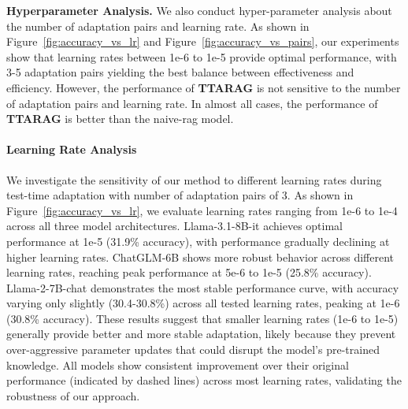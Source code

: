 \documentclass{article}
\newcommand{\ourmethod}{{\fontfamily{lmtt}\selectfont \textbf{TTARAG}}\xspace}
\begin{document}
\fi

\noindent\textbf{Hyperparameter Analysis.}
We also conduct hyper-parameter analysis about the number of adaptation pairs and learning rate. 
As shown in Figure~\ref{fig:accuracy_vs_lr} and Figure~\ref{fig:accuracy_vs_pairs}, our experiments show that learning rates between 1e-6 to 1e-5 provide optimal performance, with 3-5 adaptation pairs yielding the best balance between effectiveness and efficiency. However, the performance of \ourmethod is not sensitive to the number of adaptation pairs and learning rate. In almost all cases, the performance of \ourmethod is better than the naive-rag model.

\iffalse
\paragraph{Learning Rate Analysis} We investigate the sensitivity of our method to different learning rates during test-time adaptation with number of adaptation pairs of 3. As shown in Figure~\ref{fig:accuracy_vs_lr}, we evaluate learning rates ranging from 1e-6 to 1e-4 across all three model architectures. Llama-3.1-8B-it achieves optimal performance at 1e-5 (31.9\% accuracy), with performance gradually declining at higher learning rates. ChatGLM-6B shows more robust behavior across different learning rates, reaching peak performance at 5e-6 to 1e-5 (25.8\% accuracy). Llama-2-7B-chat demonstrates the most stable performance curve, with accuracy varying only slightly (30.4-30.8\%) across all tested learning rates, peaking at 1e-6 (30.8\% accuracy). These results suggest that smaller learning rates (1e-6 to 1e-5) generally provide better and more stable adaptation, likely because they prevent over-aggressive parameter updates that could disrupt the model's pre-trained knowledge. All models show consistent improvement over their original performance (indicated by dashed lines) across most learning rates, validating the robustness of our approach.
\end{document}
